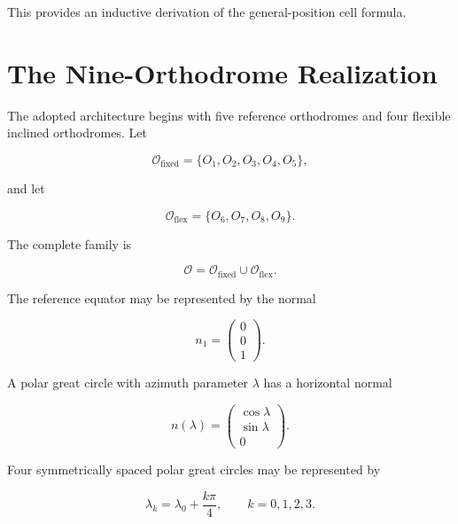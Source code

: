 \documentclass[11pt,fleqn]{book}
\numberwithin{equation}{chapter}
\theoremstyle{plain}
\theoremstyle{definition}
\theoremstyle{remark}
\newcommand{\Oset}{\mathcal{O}}
\begin{document}
This provides an inductive derivation of the general-position cell formula.

\section{The Nine-Orthodrome Realization}

The adopted architecture begins with five reference orthodromes and four flexible inclined orthodromes. Let

\begin{equation}
    \Oset_{\mathrm{fixed}}
    =
    \{O_1,O_2,O_3,O_4,O_5\},
\end{equation}

and let

\begin{equation}
    \Oset_{\mathrm{flex}}
    =
    \{O_6,O_7,O_8,O_9\}.
\end{equation}

The complete family is

\begin{equation}
    \Oset
    =
    \Oset_{\mathrm{fixed}}
    \cup
    \Oset_{\mathrm{flex}}.
\end{equation}

The reference equator may be represented by the normal

\begin{equation}
    n_1
    =
    \begin{pmatrix}
      0\\0\\1
    \end{pmatrix}.
\end{equation}

A polar great circle with azimuth parameter \(\lambda\) has a horizontal normal

\begin{equation}
    n(\lambda)
    =
    \begin{pmatrix}
      \cos\lambda\\
      \sin\lambda\\
      0
    \end{pmatrix}.
\end{equation}

Four symmetrically spaced polar great circles may be represented by

\begin{equation}
    \lambda_k
    =
    \lambda_0+\frac{k\pi}{4},
    \qquad
    k=0,1,2,3.
\end{equation}
\end{document}
